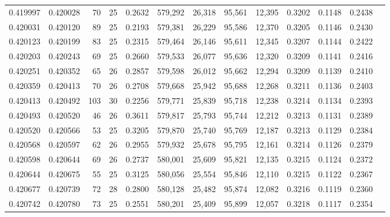 \begin{tabular}{rrrrrrrrrrrrr}
0.419997 & 0.420028 &    70 &  25 &                                     0.2632 & 579,292 &  26,318 &  95,561 &  12,395 & 0.3202 & 0.1148 & 0.2438 \\
0.420031 & 0.420120 &    89 &  25 &                                     0.2193 & 579,381 &  26,229 &  95,586 &  12,370 & 0.3205 & 0.1146 & 0.2430 \\
0.420123 & 0.420199 &    83 &  25 &                                     0.2315 & 579,464 &  26,146 &  95,611 &  12,345 & 0.3207 & 0.1144 & 0.2422 \\
0.420203 & 0.420243 &    69 &  25 &                                     0.2660 & 579,533 &  26,077 &  95,636 &  12,320 & 0.3209 & 0.1141 & 0.2416 \\
0.420251 & 0.420352 &    65 &  26 &                                     0.2857 & 579,598 &  26,012 &  95,662 &  12,294 & 0.3209 & 0.1139 & 0.2410 \\
0.420359 & 0.420413 &    70 &  26 &                                     0.2708 & 579,668 &  25,942 &  95,688 &  12,268 & 0.3211 & 0.1136 & 0.2403 \\
0.420413 & 0.420492 &   103 &  30 &                                     0.2256 & 579,771 &  25,839 &  95,718 &  12,238 & 0.3214 & 0.1134 & 0.2393 \\
0.420493 & 0.420520 &    46 &  26 &                                     0.3611 & 579,817 &  25,793 &  95,744 &  12,212 & 0.3213 & 0.1131 & 0.2389 \\
0.420520 & 0.420566 &    53 &  25 &                                     0.3205 & 579,870 &  25,740 &  95,769 &  12,187 & 0.3213 & 0.1129 & 0.2384 \\
0.420568 & 0.420597 &    62 &  26 &                                     0.2955 & 579,932 &  25,678 &  95,795 &  12,161 & 0.3214 & 0.1126 & 0.2379 \\
0.420598 & 0.420644 &    69 &  26 &                                     0.2737 & 580,001 &  25,609 &  95,821 &  12,135 & 0.3215 & 0.1124 & 0.2372 \\
0.420644 & 0.420675 &    55 &  25 &                                     0.3125 & 580,056 &  25,554 &  95,846 &  12,110 & 0.3215 & 0.1122 & 0.2367 \\
0.420677 & 0.420739 &    72 &  28 &                                     0.2800 & 580,128 &  25,482 &  95,874 &  12,082 & 0.3216 & 0.1119 & 0.2360 \\
0.420742 & 0.420780 &    73 &  25 &                                     0.2551 & 580,201 &  25,409 &  95,899 &  12,057 & 0.3218 & 0.1117 & 0.2354 \\

\end{tabular}
